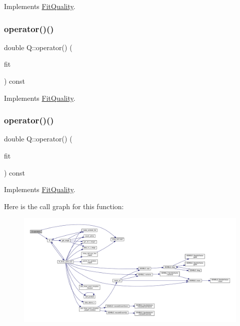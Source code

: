 Implements \mbox{\hyperlink{classFitQuality_a3423e236f25d68cf822094b363a74780}{Fit\+Quality}}.

\mbox{\label{classQ_a783778170d5dbec7517dbe5c6f00a3c3}} 
\subsubsection{\texorpdfstring{operator()()}{operator()()}\hspace{0.1cm}{\footnotesize\ttfamily [1/2]}}
{\footnotesize\ttfamily double Q\+::operator() (\begin{DoxyParamCaption}\item[{const \mbox{\hyperlink{classAvgFit}{Avg\+Fit}} \&}]{fit }\end{DoxyParamCaption}) const\hspace{0.3cm}{\ttfamily [virtual]}}



Implements \mbox{\hyperlink{classFitQuality_a49a49e1206709d71c3ead41e981bb848}{Fit\+Quality}}.

\mbox{\label{classQ_a783778170d5dbec7517dbe5c6f00a3c3}} 
\subsubsection{\texorpdfstring{operator()()}{operator()()}\hspace{0.1cm}{\footnotesize\ttfamily [2/2]}}
{\footnotesize\ttfamily double Q\+::operator() (\begin{DoxyParamCaption}\item[{const \mbox{\hyperlink{classAvgFit}{Avg\+Fit}} \&}]{fit }\end{DoxyParamCaption}) const\hspace{0.3cm}{\ttfamily [virtual]}}



Implements \mbox{\hyperlink{classFitQuality_a49a49e1206709d71c3ead41e981bb848}{Fit\+Quality}}.

Here is the call graph for this function\+:
\nopagebreak
\begin{figure}[H]
\begin{center}
\leavevmode
\includegraphics[width=350pt]{d1/d5c/classQ_a783778170d5dbec7517dbe5c6f00a3c3_cgraph}
\end{center}
\end{figure}


